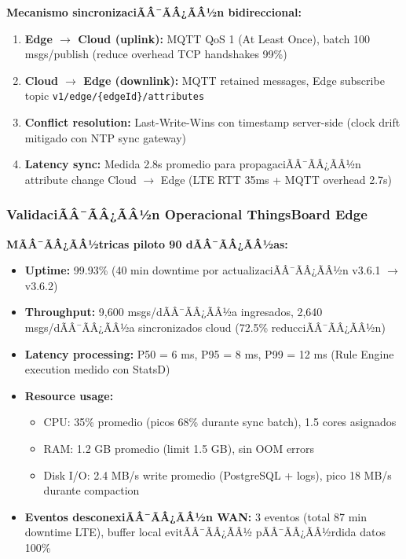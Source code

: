 \textbf{Mecanismo sincronizaciÃÂ¯ÃÂ¿ÃÂ½n bidireccional:}

\begin{enumerate}
    \item \textbf{Edge $\rightarrow$ Cloud (uplink):} MQTT QoS 1 (At Least Once), batch 100 msgs/publish (reduce overhead TCP handshakes 99\%)
    \item \textbf{Cloud $\rightarrow$ Edge (downlink):} MQTT retained messages, Edge subscribe topic \texttt{v1/edge/\{edgeId\}/attributes}
    \item \textbf{Conflict resolution:} Last-Write-Wins con timestamp server-side (clock drift mitigado con NTP sync gateway)
    \item \textbf{Latency sync:} Medida 2.8s promedio para propagaciÃÂ¯ÃÂ¿ÃÂ½n attribute change Cloud $\rightarrow$ Edge (LTE RTT 35ms + MQTT overhead 2.7s)
\end{enumerate}

\subsubsection{ValidaciÃÂ¯ÃÂ¿ÃÂ½n Operacional ThingsBoard Edge}

\textbf{MÃÂ¯ÃÂ¿ÃÂ½tricas piloto 90 dÃÂ¯ÃÂ¿ÃÂ½as:}

\begin{itemize}
    \item \textbf{Uptime:} 99.93\% (40 min downtime por actualizaciÃÂ¯ÃÂ¿ÃÂ½n v3.6.1 $\rightarrow$ v3.6.2)
    \item \textbf{Throughput:} 9,600 msgs/dÃÂ¯ÃÂ¿ÃÂ½a ingresados, 2,640 msgs/dÃÂ¯ÃÂ¿ÃÂ½a sincronizados cloud (72.5\% reducciÃÂ¯ÃÂ¿ÃÂ½n)
    \item \textbf{Latency processing:} P50 = 6 ms, P95 = 8 ms, P99 = 12 ms (Rule Engine execution medido con StatsD)
    \item \textbf{Resource usage:}
    \begin{itemize}
        \item CPU: 35\% promedio (picos 68\% durante sync batch), 1.5 cores asignados
        \item RAM: 1.2 GB promedio (limit 1.5 GB), sin OOM errors
        \item Disk I/O: 2.4 MB/s write promedio (PostgreSQL + logs), pico 18 MB/s durante compaction
    \end{itemize}
    \item \textbf{Eventos desconexiÃÂ¯ÃÂ¿ÃÂ½n WAN:} 3 eventos (total 87 min downtime LTE), buffer local evitÃÂ¯ÃÂ¿ÃÂ½ pÃÂ¯ÃÂ¿ÃÂ½rdida datos 100\%
\end{itemize}


